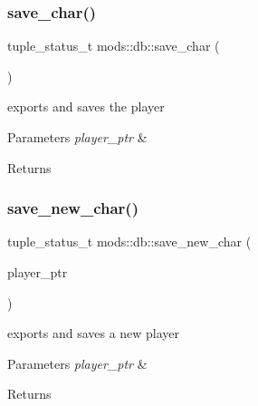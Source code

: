 \subsubsection{\texorpdfstring{save\+\_\+char()}{save\_char()}}
{\footnotesize\ttfamily tuple\+\_\+status\+\_\+t mods\+::db\+::save\+\_\+char (\begin{DoxyParamCaption}\item[{player\+\_\+ptr\+\_\+t}]{ }\end{DoxyParamCaption})}



exports and saves the player 


\begin{DoxyParams}{Parameters}
{\em player\+\_\+ptr} & \\
\hline
\end{DoxyParams}
\begin{DoxyReturn}{Returns}

\end{DoxyReturn}
\mbox{\label{namespacemods_1_1db_a8bccbc433ca6a53482a62f5181230d9b}} 
\subsubsection{\texorpdfstring{save\+\_\+new\+\_\+char()}{save\_new\_char()}}
{\footnotesize\ttfamily tuple\+\_\+status\+\_\+t mods\+::db\+::save\+\_\+new\+\_\+char (\begin{DoxyParamCaption}\item[{player\+\_\+ptr\+\_\+t}]{player\+\_\+ptr }\end{DoxyParamCaption})}



exports and saves a new player 


\begin{DoxyParams}{Parameters}
{\em player\+\_\+ptr} & \\
\hline
\end{DoxyParams}
\begin{DoxyReturn}{Returns}

\end{DoxyReturn}
\mbox{\label{namespacemods_1_1db_af5d88db0c82983fcb247497adeeec339}} 
